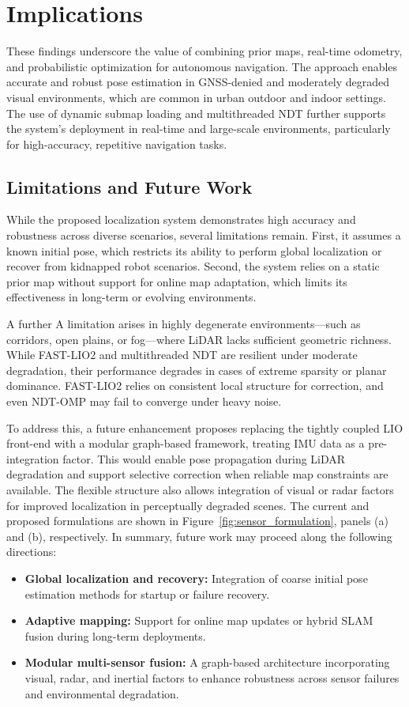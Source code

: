 \section{Implications}
These findings underscore the value of combining prior maps, real-time odometry, and probabilistic optimization for autonomous navigation. The approach enables accurate and robust pose estimation in GNSS-denied and moderately degraded visual environments, which are common in urban outdoor and indoor settings. The use of dynamic submap loading and multithreaded NDT further supports the system’s deployment in real-time and large-scale environments, particularly for high-accuracy, repetitive navigation tasks.


\subsection{Limitations and Future Work}

While the proposed localization system demonstrates high accuracy and robustness across diverse scenarios, several limitations remain. First, it assumes a known initial pose, which restricts its ability to perform global localization or recover from kidnapped robot scenarios. Second, the system relies on a static prior map without support for online map adaptation, which limits its effectiveness in long-term or evolving environments.

A further A limitation arises in highly degenerate environments—such as corridors, open plains, or fog—where LiDAR lacks sufficient geometric richness. While FAST-LIO2 and multithreaded NDT are resilient under moderate degradation, their performance degrades in cases of extreme sparsity or planar dominance. FAST-LIO2 relies on consistent local structure for correction, and even NDT-OMP may fail to converge under heavy noise.

To address this, a future enhancement proposes replacing the tightly coupled LIO front-end with a modular graph-based framework, treating IMU data as a pre-integration factor. This would enable pose propagation during LiDAR degradation and support selective correction when reliable map constraints are available. The flexible structure also allows integration of visual or radar factors for improved localization in perceptually degraded scenes. The current and proposed formulations are shown in Figure~\ref{fig:sensor_formulation}, panels (a) and (b), respectively.
In summary, future work may proceed along the following directions:
\begin{itemize}
	\item \textbf{Global localization and recovery:} Integration of coarse initial pose estimation methods for startup or failure recovery.
	\item \textbf{Adaptive mapping:} Support for online map updates or hybrid SLAM fusion during long-term deployments.
	\item \textbf{Modular multi-sensor fusion:} A graph-based architecture incorporating visual, radar, and inertial factors to enhance robustness across sensor failures and environmental degradation.
\end{itemize}


